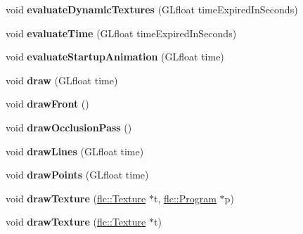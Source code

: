 \begin{DoxyCompactItemize}
void {\bfseries evaluate\+Dynamic\+Textures} (G\+Lfloat time\+Expired\+In\+Seconds)
\item 
\mbox{\label{structflw_1_1Engine_1_1EngineImpl_af5b5a4401b9e6a1cc5e6f2e1748dd269}} 
void {\bfseries evaluate\+Time} (G\+Lfloat time\+Expired\+In\+Seconds)
\item 
\mbox{\label{structflw_1_1Engine_1_1EngineImpl_aaeac74a253101e6f085752641b8b7501}} 
void {\bfseries evaluate\+Startup\+Animation} (G\+Lfloat time)
\item 
\mbox{\label{structflw_1_1Engine_1_1EngineImpl_a9f91dee83c906b0940d8156e3800e120}} 
void {\bfseries draw} (G\+Lfloat time)
\item 
\mbox{\label{structflw_1_1Engine_1_1EngineImpl_a329502c8752b2e68914f84a80ef841d8}} 
void {\bfseries draw\+Front} ()
\item 
\mbox{\label{structflw_1_1Engine_1_1EngineImpl_a237ecd636d811a54c3150ee739ad273f}} 
void {\bfseries draw\+Occlusion\+Pass} ()
\item 
\mbox{\label{structflw_1_1Engine_1_1EngineImpl_a2dda435bd16aa5f2a05edc1c14dd3250}} 
void {\bfseries draw\+Lines} (G\+Lfloat time)
\item 
\mbox{\label{structflw_1_1Engine_1_1EngineImpl_aafd3d812bf9177de85b3625fc11e770b}} 
void {\bfseries draw\+Points} (G\+Lfloat time)
\item 
\mbox{\label{structflw_1_1Engine_1_1EngineImpl_ab4aaa6f91dc4cafd3079b307db6852ee}} 
void {\bfseries draw\+Texture} (\hyperlink{classflw_1_1flc_1_1Texture}{flc\+::\+Texture} $\ast$t, \hyperlink{classflw_1_1flc_1_1Program}{flc\+::\+Program} $\ast$p)
\item 
\mbox{\label{structflw_1_1Engine_1_1EngineImpl_afbc03d22d3b97a99ce5772fd0cd2fbc1}} 
void {\bfseries draw\+Texture} (\hyperlink{classflw_1_1flc_1_1Texture}{flc\+::\+Texture} $\ast$t)
\item 

\end{DoxyCompactItemize}
